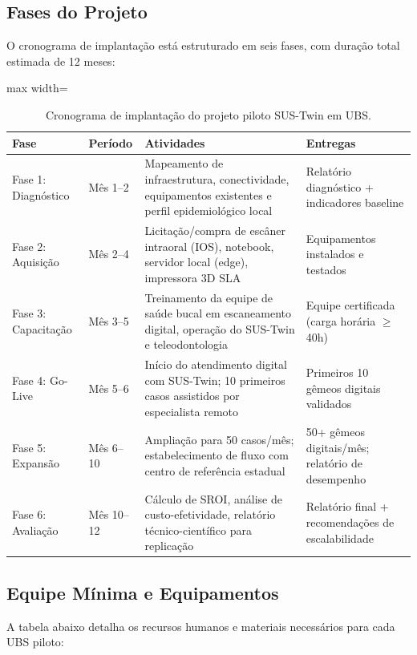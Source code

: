 \subsection{Fases do Projeto}

O cronograma de implantação está estruturado em seis fases, com
duração total estimada de 12 meses:

\begin{table}[htbp]
\centering
\caption{Cronograma de implantação do projeto piloto SUS-Twin em UBS.}
\label{tab:cronograma-piloto}
\begin{adjustbox}{max width=\textwidth}
\begin{tabular}{lp{3.5cm}p{5cm}p{4cm}}
\toprule
\textbf{Fase} & \textbf{Período} & \textbf{Atividades} &
\textbf{Entregas} \\
\midrule
Fase 1: Diagnóstico & Mês 1--2 & Mapeamento de infraestrutura,
conectividade, equipamentos existentes e perfil epidemiológico local &
Relatório diagnóstico + indicadores baseline \\
Fase 2: Aquisição & Mês 2--4 & Licitação/compra de escâner intraoral
(IOS), notebook, servidor local (edge), impressora 3D SLA &
Equipamentos instalados e testados \\
Fase 3: Capacitação & Mês 3--5 & Treinamento da equipe de saúde bucal
em escaneamento digital, operação do SUS-Twin e teleodontologia &
Equipe certificada (carga horária $\ge$ 40h) \\
Fase 4: Go-Live & Mês 5--6 & Início do atendimento digital com
SUS-Twin; 10 primeiros casos assistidos por especialista remoto &
Primeiros 10 gêmeos digitais validados \\
Fase 5: Expansão & Mês 6--10 & Ampliação para 50 casos/mês;
estabelecimento de fluxo com centro de referência estadual &
50+ gêmeos digitais/mês; relatório de desempenho \\
Fase 6: Avaliação & Mês 10--12 & Cálculo de SROI, análise de
custo-efetividade, relatório técnico-científico para replicação &
Relatório final + recomendações de escalabilidade \\
\bottomrule
\end{tabular}
\end{adjustbox}
\end{table}

\subsection{Equipe Mínima e Equipamentos}

A tabela abaixo detalha os recursos humanos e materiais necessários
para cada UBS piloto:

